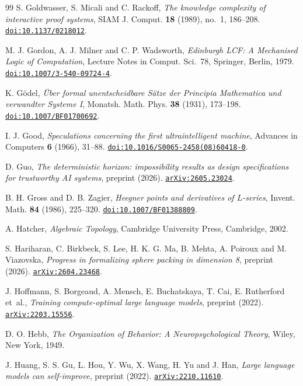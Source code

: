 \begin{thebibliography}{99}
S. Goldwasser, S. Micali and C. Rackoff,
\emph{The knowledge complexity of interactive proof systems},
SIAM J. Comput. \textbf{18} (1989), no.~1, 186--208.
\href{https://doi.org/10.1137/0218012}{\nolinkurl{doi:10.1137/0218012}}.

M. J. Gordon, A. J. Milner and C. P. Wadsworth,
\emph{Edinburgh LCF: A Mechanised Logic of Computation},
Lecture Notes in Comput. Sci.~78, Springer, Berlin, 1979.
\href{https://doi.org/10.1007/3-540-09724-4}{\nolinkurl{doi:10.1007/3-540-09724-4}}.

K. G\"odel,
\emph{\"Uber formal unentscheidbare S\"atze der Principia Mathematica und verwandter Systeme I},
Monatsh. Math. Phys. \textbf{38} (1931), 173--198.
\href{https://doi.org/10.1007/BF01700692}{\nolinkurl{doi:10.1007/BF01700692}}.

I. J. Good,
\emph{Speculations concerning the first ultraintelligent machine},
Advances in Computers \textbf{6} (1966), 31--88.
\href{https://doi.org/10.1016/S0065-2458(08)60418-0}{\nolinkurl{doi:10.1016/S0065-2458(08)60418-0}}.

D. Guo,
\emph{The deterministic horizon: impossibility results as design specifications for trustworthy AI systems},
preprint (2026).
\href{https://arxiv.org/abs/2605.23024}{\nolinkurl{arXiv:2605.23024}}.

B. H. Gross and D. B. Zagier,
\emph{Heegner points and derivatives of $L$-series},
Invent. Math. \textbf{84} (1986), 225--320.
\href{https://doi.org/10.1007/BF01388809}{\nolinkurl{doi:10.1007/BF01388809}}.

A. Hatcher,
\emph{Algebraic Topology},
Cambridge University Press, Cambridge, 2002.

S. Hariharan, C. Birkbeck, S. Lee, H. K. G. Ma, B. Mehta, A. Poiroux and M. Viazovska,
\emph{Progress in formalizing sphere packing in dimension 8},
preprint (2026).
\href{https://arxiv.org/abs/2604.23468}{\nolinkurl{arXiv:2604.23468}}.

J. Hoffmann, S. Borgeaud, A. Mensch, E. Buchatskaya, T. Cai, E. Rutherford et~al.,
\emph{Training compute-optimal large language models},
preprint (2022).
\href{https://arxiv.org/abs/2203.15556}{\nolinkurl{arXiv:2203.15556}}.

D. O. Hebb,
\emph{The Organization of Behavior: A Neuropsychological Theory},
Wiley, New York, 1949.

J. Huang, S. S. Gu, L. Hou, Y. Wu, X. Wang, H. Yu and J. Han,
\emph{Large language models can self-improve},
preprint (2022).
\href{https://arxiv.org/abs/2210.11610}{\nolinkurl{arXiv:2210.11610}}.


\end{thebibliography}
